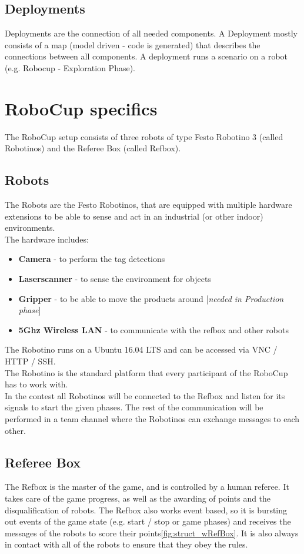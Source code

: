 \subsection{Deployments}
\label{subsec:Deployments}
Deployments are the connection of all needed components.
A Deployment mostly consists of a map (model driven - code is generated) that describes the connections between all components.
A deployment runs a scenario on a robot (e.g. Robocup - Exploration Phase).

\section{RoboCup specifics}
The RoboCup setup consists of three robots of type Festo Robotino 3 (called Robotinos) and the Referee Box (called Refbox).

\subsection{Robots}
The Robots are the Festo Robotinos, that are equipped with multiple hardware extensions to be able to sense and act
in an industrial (or other indoor) environments.\\
The hardware includes:
\begin{itemize}
    \item \textbf{Camera} - to perform the tag detections
    \item \textbf{Laserscanner} - to sense the environment for objects
    \item \textbf{Gripper} - to be able to move the products around [\textit{needed in Production phase}]
    \item \textbf{5Ghz Wireless LAN} - to communicate with the refbox and other robots
\end{itemize}

The Robotino runs on a Ubuntu 16.04 LTS and can be accessed via VNC / HTTP / SSH.\\

The Robotino is the standard platform that every participant of the RoboCup has to work with.\\
In the contest all Robotinos will be connected to the Refbox and listen for its signals to start the given phases.
The rest of the communication will be performed in a team channel where the Robotinos can exchange messages to each other.
\newpage

\subsection{Referee Box}
The Refbox is the master of the game, and is controlled by a human referee. It takes care of the game progress, as well as the awarding of points and the disqualification of robots.
The Refbox also works event based, so it is bursting out events of the game state (e.g. start / stop or game phases) and receives the messages of the robots to score their points\ref{fig:struct_wRefBox}.
It is also always in contact with all of the robots to ensure that they obey the rules.

